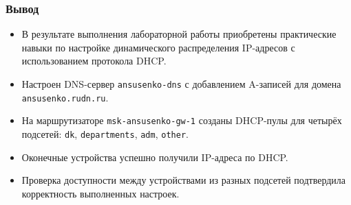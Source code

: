 \begin{frame}
\frametitle{Вывод}
\begin{itemize}
    \item В результате выполнения лабораторной работы приобретены практические навыки по настройке динамического распределения IP-адресов с использованием протокола DHCP.
    \item Настроен DNS-сервер \texttt{ansusenko-dns} с добавлением A-записей для домена \texttt{ansusenko.rudn.ru}.
    \item На маршрутизаторе \texttt{msk-ansusenko-gw-1} созданы DHCP-пулы для четырёх подсетей: \texttt{dk}, \texttt{departments}, \texttt{adm}, \texttt{other}.
    \item Оконечные устройства успешно получили IP-адреса по DHCP.
    \item Проверка доступности между устройствами из разных подсетей подтвердила корректность выполненных настроек.
\end{itemize}

\end{frame}


